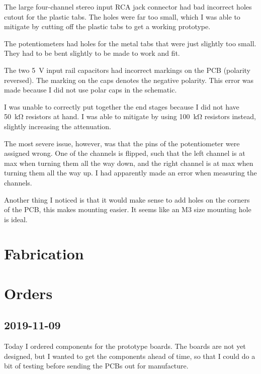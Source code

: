 \documentclass[a4paper]{article}
\begin{document}
The large four-channel stereo input RCA jack connector had bad incorrect holes cutout for the plastic tabs. The holes were far too small, which I was able to mitigate by cutting off the plastic tabs to get a working prototype.

The potentiometers had holes for the metal tabs that were just slightly too small. They had to be bent slightly to be made to work and fit. 

The two \SI{5}{\volt} input rail capacitors had incorrect markings on the PCB (polarity reversed). The marking on the caps denotes the negative polarity. This error was made because I did not use polar caps in the schematic.

I was unable to correctly put together the end stages because I did not have \SI{50}{\kilo\ohm} resistors at hand. I was able to mitigate by using \SI{100}{\kilo\ohm} resistors instead, slightly increasing the attenuation. 

The most severe issue, however, was that the pins of the potentiometer were assigned wrong. One of the channels is flipped, such that the left channel is at max when turning them all the way down, and the right channel is at max when turning them all the way up. I had apparently made an error when measuring the channels.


Another thing I noticed is that it would make sense to add holes on the corners of the PCB, this makes mounting easier. It seems like an M3 size mounting hole is ideal.



\section{Fabrication}

\section{Orders}

\subsection{2019-11-09}

Today I ordered components for the prototype boards. The boards are not yet designed, but I wanted to get the components ahead of time, so that I could do a bit of testing before sending the PCBs out for manufacture.
\end{document}
